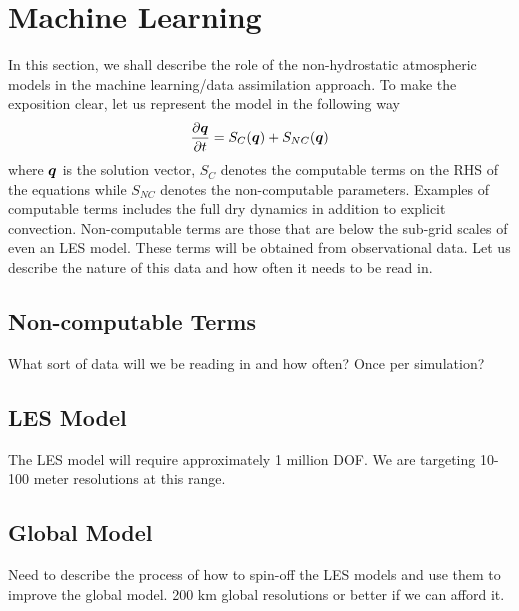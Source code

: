 \documentclass[12pt]{article}
\begin{document}
\section{Machine Learning}
\label{sec:machine_learning}

In this section, we shall describe the role of the non-hydrostatic atmospheric models in the machine learning/data assimilation approach.  To make the exposition clear, let us represent the model in the following way
\[
\frac{\partial \mbox{\boldmath$q$\unboldmath}}{\partial t} = S_C(\mbox{\boldmath$q$\unboldmath}) + S_{NC}(\mbox{\boldmath$q$\unboldmath})
\]
where $\mbox{\boldmath$q$\unboldmath}$ is the solution vector, $S_C$ denotes the computable terms on the RHS of the equations while $S_{NC}$ denotes the non-computable parameters.  Examples of computable terms includes the full dry dynamics in addition to explicit convection.  Non-computable terms are those that are below the sub-grid scales of even an LES model.  These terms will be obtained from observational data.  Let us describe the nature of this data and how often it needs to be read in.

\subsection{Non-computable Terms}
What sort of data will we be reading in and how often? Once per simulation?  

\subsection{LES Model}
The LES model will require approximately 1 million DOF.  We are targeting 10-100 meter resolutions at this range.

\subsection{Global Model}
Need to describe the process of how to spin-off the LES models and use them to improve the global model. 200 km global resolutions or better if we can afford it. 




\end{document}
